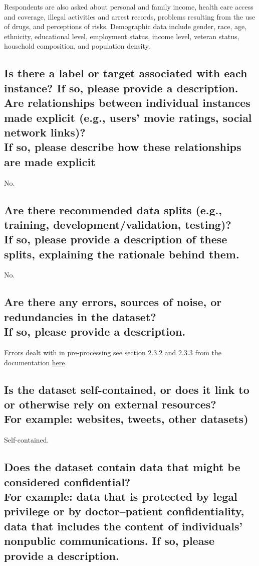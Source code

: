 \documentclass[letterpaper, 10 pt, conference]{ieeeconf}  %
\newcommand{\subtitle}[1]{{\\ \small \normalfont \color{purple} #1}}
\begin{document}
Respondents are also asked about personal and family income, health care access and coverage, illegal activities and arrest records, problems resulting from the use of drugs, and perceptions of risks. Demographic data include gender, race, age, ethnicity, educational level, employment status, income level, veteran status, household composition, and population density.

\subsection{Is there a label or target associated with each instance? If so, please provide a description. Are relationships between individual instances made explicit (e.g., users’ movie ratings, social network links)? \subtitle{If so, please describe how these relationships are made explicit}}

No.

\subsection{Are there recommended data splits (e.g., training, development/validation, testing)? \subtitle{If so, please provide a description of these splits, explaining the rationale behind them.}}

No.

\subsection{Are there any errors, sources of noise, or redundancies in the dataset? \subtitle{If so, please provide a description.}}

Errors dealt with in pre-processing see section 2.3.2 and 2.3.3 from the documentation \href{https://www.samhsa.gov/data/sites/default/files/reports/rpt35330/2020NSDUHMethodSummDefs091721.pdf}{here}.

\subsection{Is the dataset self-contained, or does it link to or otherwise rely on external resources? \subtitle{For example: websites, tweets, other datasets)}}

Self-contained.

\subsection{Does the dataset contain data that might be considered confidential? \subtitle{For example: data that is protected by legal privilege or by doctor–patient confidentiality, data that includes the content of individuals’ nonpublic communications. If so, please provide a description.}}
\end{document}
